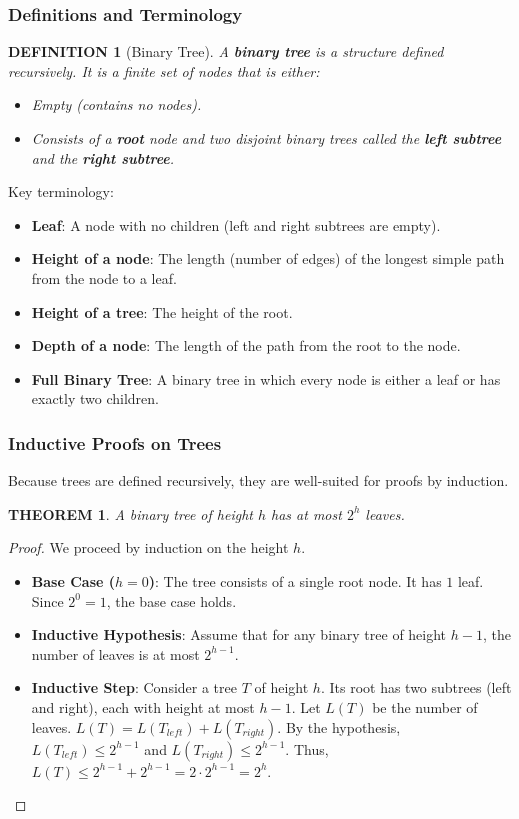 \documentclass[12pt]{article}
\theoremstyle{blueplain}
\newtheorem{theorem}{THEOREM}[section]
\theoremstyle{bluedef}
\newtheorem{definition}{DEFINITION}[section]
\theoremstyle{blueremark}
\begin{document}
\subsubsection{Definitions and Terminology}

\begin{definition}[Binary Tree]
    A \textbf{binary tree} is a structure defined recursively. It is a finite set of nodes that is either:
    \begin{itemize}
        \item Empty (contains no nodes).
        \item Consists of a \textbf{root} node and two disjoint binary trees called the \textbf{left subtree} and the \textbf{right subtree}.
    \end{itemize}
\end{definition}

Key terminology:
\begin{itemize}
    \item \textbf{Leaf}: A node with no children (left and right subtrees are empty).
    \item \textbf{Height of a node}: The length (number of edges) of the longest simple path from the node to a leaf.
    \item \textbf{Height of a tree}: The height of the root.
    \item \textbf{Depth of a node}: The length of the path from the root to the node.
    \item \textbf{Full Binary Tree}: A binary tree in which every node is either a leaf or has exactly two children.
\end{itemize}

\subsubsection{Inductive Proofs on Trees}
Because trees are defined recursively, they are well-suited for proofs by induction.

\begin{theorem}
    A binary tree of height $h$ has at most $2^h$ leaves.
\end{theorem}
\begin{proof}
    We proceed by induction on the height $h$.
    \begin{itemize}
        \item \textbf{Base Case ($h=0$)}: The tree consists of a single root node. It has $1$ leaf. Since $2^0 = 1$, the base case holds.
        \item \textbf{Inductive Hypothesis}: Assume that for any binary tree of height $h-1$, the number of leaves is at most $2^{h-1}$.
        \item \textbf{Inductive Step}: Consider a tree $T$ of height $h$. Its root has two subtrees (left and right), each with height at most $h-1$.
              Let $L(T)$ be the number of leaves. $L(T) = L(T_{left}) + L(T_{right})$.
              By the hypothesis, $L(T_{left}) \le 2^{h-1}$ and $L(T_{right}) \le 2^{h-1}$.
              Thus, $L(T) \le 2^{h-1} + 2^{h-1} = 2 \cdot 2^{h-1} = 2^h$.
    \end{itemize}
\end{proof}
\end{document}
